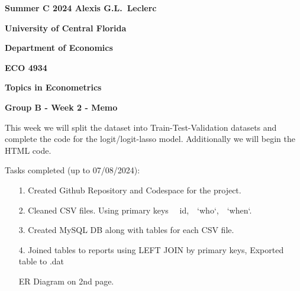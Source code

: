 \documentclass[11pt]{book}
\begin{document}
\pagestyle{empty}
{\noindent\bf Summer C 2024 \hfill Alexis  G.L.~Leclerc}
\vskip 16pt
\centerline{\bf University of Central Florida}
\centerline{\bf Department of Economics}
\vskip 16pt
\centerline{\bf ECO 4934}
\centerline{\bf Topics in Econometrics}
\vskip 10pt
\centerline{\bf Group B - Week 2 - Memo}
\vskip 20pt
\noindent

This week we will split the dataset into Train-Test-Validation datasets and complete the code for the logit/logit-lasso model. Additionally we will begin the HTML code.
\begin{center}Tasks completed (up to 07/08/2024):\end{center}
\begin{itemize}
    \item[1.] Created Github Repository and Codespace for the project. 
    \item[2.] Cleaned CSV files. Using primary keys~~ id,~~`who`,~~`when`.
    \item[3.] Created MySQL DB along with tables for each CSV file. 
    \item[4.] Joined tables to reports using LEFT JOIN by primary keys, Exported table to .dat\vspace{\baselineskip}
\vspace{\baselineskip}

   \hspace{2em} ER Diagram on 2nd page.
\end{itemize}

\end{document}
